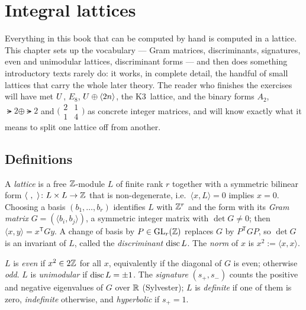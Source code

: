 \chapter{Integral lattices}\label{ch:lattices}

Everything in this book that can be computed by hand is computed in a lattice.
This chapter sets up the vocabulary --- Gram matrices, discriminants,
signatures, even and unimodular lattices, discriminant forms --- and then does
something introductory texts rarely do: it works, in complete detail, the
handful of small lattices that carry the whole later theory. The reader who
finishes the exercises will have met $U$, $E_8$, $U\oplus\langle 2n\rangle$, the
K3~lattice, and the binary forms $A_2$, $\lat2\oplus\lat2$ and
$\bigl(\begin{smallmatrix}2&1\\1&4\end{smallmatrix}\bigr)$ as concrete integer
matrices, and will know exactly what it means to split one lattice off from
another.

\section{Definitions}

\begin{definition}
A \emph{lattice} is a free $\mathbb{Z}$-module $L$ of finite rank $r$ together with a
symmetric bilinear form $\langle\ ,\ \rangle\colon L\times L\to\mathbb{Z}$ that is
non-degenerate, i.e.\ $\langle x,L\rangle=0$ implies $x=0$. Choosing a basis
$(b_1,\dots,b_r)$ identifies $L$ with $\mathbb{Z}^r$ and the form with its \emph{Gram
matrix} $G=(\langle b_i,b_j\rangle)$, a symmetric integer matrix with
$\det G\neq0$; then $\langle x,y\rangle=x^{\mathsf T}Gy$. A change of basis by
$P\in\operatorname{GL}_r(\mathbb{Z})$ replaces $G$ by $P^{\mathsf T}GP$, so $\det G$ is an invariant
of $L$, called the \emph{discriminant} $\operatorname{disc} L$. The \emph{norm} of $x$ is
$x^2:=\langle x,x\rangle$.
\end{definition}

\begin{definition}
$L$ is \emph{even} if $x^2\in2\mathbb{Z}$ for all $x$, equivalently if the diagonal of
$G$ is even; otherwise \emph{odd}. $L$ is \emph{unimodular} if $\operatorname{disc} L=\pm1$.
The \emph{signature} $(s_+,s_-)$ counts the positive and negative eigenvalues
of $G$ over $\mathbb{R}$ (Sylvester); $L$ is \emph{definite} if one of them is zero,
\emph{indefinite} otherwise, and \emph{hyperbolic} if $s_+=1$.
\end{definition}

